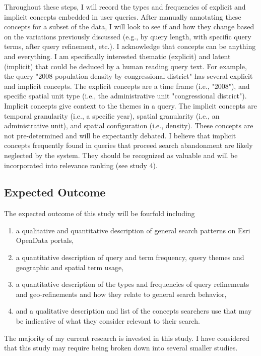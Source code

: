 Throughout these steps, I will record the types and frequencies of explicit and implicit concepts embedded in user queries. After manually annotating these concepts for a subset of the data, I will look to see if and how they change based on the variations previously discussed (e.g., by query length, with specific query terms, after query refinement, etc.). I acknowledge that concepts can be anything and everything. I am specifically interested thematic (explicit) and latent (implicit) that could be deduced by a human reading query text. For example, the query "2008 population density by congressional district" has several explicit and implicit concepts. The explicit concepts are a time frame (i.e., "2008"), and specific spatial unit type (i.e., the administrative unit "congressional district"). Implicit concepts give context to the themes in a query. The implicit concepts are temporal granularity (i.e., a specific year), spatial granularity (i.e., an administrative unit), and spatial configuration (i.e., density). These concepts are not pre-determined and will be expectantly debated. I believe that implicit concepts frequently found in queries that proceed search abandonment are likely neglected by the system. They should be recognized as valuable and will be incorporated into relevance ranking (see study 4).

\subsection{Expected Outcome}
The expected outcome of this study will be fourfold including 
\begin{enumerate}
    \item a qualitative and quantitative description of general search patterns on Esri OpenData portals,
    \item a quantitative description of query and term frequency, query themes and geographic and spatial term usage,
    \item a quantitative description of the types and frequencies of query refinements and geo-refinements and how they relate to general search behavior,
    \item and a qualitative description and list of the concepts searchers use that may be indicative of what they consider relevant to their search.
\end{enumerate}

The majority of my current research is invested in this study. I have considered that this study may require being broken down into several smaller studies.


